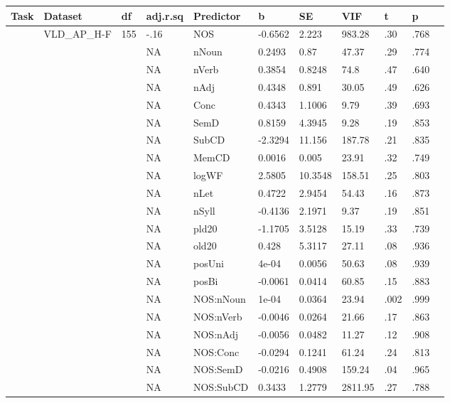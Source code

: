 \begin{table}[ht]
\centering
\begingroup\normalsize
\begin{tabular}{lllllllllll}
  \hline
Task & Dataset & df & adj.r.sq & Predictor & b & SE & VIF & t & p &  \\ 
  \hline
 & VLD\_AP\_H-F & 155 & -.16 & NOS & -0.6562 & 2.223 & 983.28 & .30 & .768 &   \\ 
   &  &  & NA & nNoun & 0.2493 & 0.87 & 47.37 & .29 & .774 &   \\ 
   &  &  & NA & nVerb & 0.3854 & 0.8248 & 74.8 & .47 & .640 &   \\ 
   &  &  & NA & nAdj & 0.4348 & 0.891 & 30.05 & .49 & .626 &   \\ 
   &  &  & NA & Conc & 0.4343 & 1.1006 & 9.79 & .39 & .693 &   \\ 
   &  &  & NA & SemD & 0.8159 & 4.3945 & 9.28 & .19 & .853 &   \\ 
   &  &  & NA & SubCD & -2.3294 & 11.156 & 187.78 & .21 & .835 &   \\ 
   &  &  & NA & MemCD & 0.0016 & 0.005 & 23.91 & .32 & .749 &   \\ 
   &  &  & NA & logWF & 2.5805 & 10.3548 & 158.51 & .25 & .803 &   \\ 
   &  &  & NA & nLet & 0.4722 & 2.9454 & 54.43 & .16 & .873 &   \\ 
   &  &  & NA & nSyll & -0.4136 & 2.1971 & 9.37 & .19 & .851 &   \\ 
   &  &  & NA & pld20 & -1.1705 & 3.5128 & 15.19 & .33 & .739 &   \\ 
   &  &  & NA & old20 & 0.428 & 5.3117 & 27.11 & .08 & .936 &   \\ 
   &  &  & NA & posUni & 4e-04 & 0.0056 & 50.63 & .08 & .939 &   \\ 
   &  &  & NA & posBi & -0.0061 & 0.0414 & 60.85 & .15 & .883 &   \\ 
   &  &  & NA & NOS:nNoun & 1e-04 & 0.0364 & 23.94 & .002 & .999 &   \\ 
   &  &  & NA & NOS:nVerb & -0.0046 & 0.0264 & 21.66 & .17 & .863 &   \\ 
   &  &  & NA & NOS:nAdj & -0.0056 & 0.0482 & 11.27 & .12 & .908 &   \\ 
   &  &  & NA & NOS:Conc & -0.0294 & 0.1241 & 61.24 & .24 & .813 &   \\ 
   &  &  & NA & NOS:SemD & -0.0216 & 0.4908 & 159.24 & .04 & .965 &   \\ 
   &  &  & NA & NOS:SubCD & 0.3433 & 1.2779 & 2811.95 & .27 & .788 &   \\ 

\end{tabular}
\end{table}
